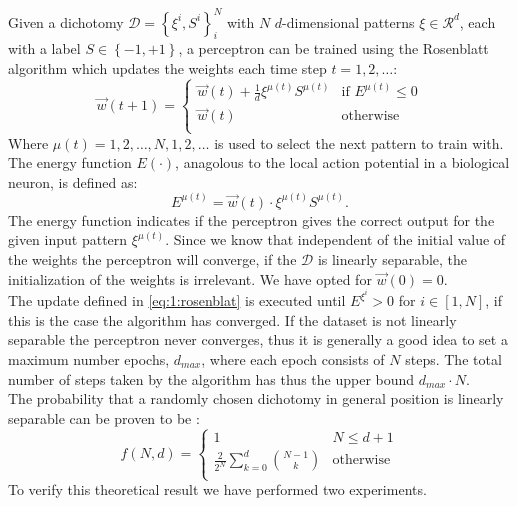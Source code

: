 Given a dichotomy $\mathcal{D} = \left\{\xi^i, S^i \right\}_{i}^{N}$ with $N$ $d$-dimensional patterns $\xi \in \mathcal{R}^d$, each with a label $S \in \left\{-1, +1 \right\}$, a perceptron can be trained using the Rosenblatt algorithm  which updates the weights each time step $t = 1, 2, \ldots$:
	\begin{equation}\label{eq:1:rosenblat}
		\vec{w}(t+1) = 
		\begin{cases}
		\vec{w}(t) + \frac{1}{d} \xi^{\mu(t)} S^{\mu(t)}
		& \text{if } E^{\mu(t)} \leq 0\\
		\vec{w}(t) 											
		& \text{otherwise}\\
		\end{cases}
	\end{equation}
Where $\mu(t) = 1, 2, \ldots, N, 1, 2, \ldots$ is used to select the next pattern to train with. The energy function $E(\cdot)$, anagolous to the local action potential in a biological neuron, is defined as:
	\begin{equation}\label{eq:1:energyFunction}
		E^{\mu(t)} = \vec{w}(t) \cdot \xi^{\mu(t)}S^{\mu(t)}.
	\end{equation}
The energy function indicates if the perceptron gives the correct output for the given input pattern $\xi^{\mu(t)}$. Since we know that independent of the initial value of the weights the perceptron will converge, if the $\mathcal{D}$ is linearly separable, the initialization of the weights is irrelevant. We have opted for $\vec{w}(0) = 0$.\\

The update defined in \autoref{eq:1:rosenblat} is executed until $E^{\xi^i} > 0$ for $i \in [1, N]$, if this is the case the algorithm has converged. If the dataset is not linearly separable the perceptron never converges, thus it is generally a good idea to set a maximum number epochs, $d_{max}$, where each epoch consists of $N$ steps. The total number of steps taken by the algorithm has thus the upper bound $d_{max} \cdot N$. \\


The probability that a randomly chosen dichotomy  in general position is linearly separable can be proven to be \cite{reed1998neural}:
	\begin{equation}\label{eq:1:lsChance}
		f(N,d) = 
		\begin{cases}
		1
		& N \leq d + 1\\
		\frac{2}{2^N} \displaystyle\sum_{k = 0}^{d} \binom{N - 1}{k}										
		& \text{otherwise}\\
		\end{cases}
	\end{equation}
To verify this theoretical result we have performed two experiments.


